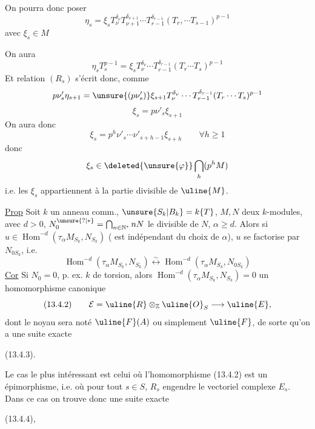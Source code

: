 On pourra donc poser
\[
\eta_s=\xi_s T_\nu^{\delta_\nu}T_{\nu+1}^{\delta_{\nu+1}}\cdots T_{r-1}^{\delta_{r-1}}(T_r,\cdots T_{s-1})^{p-1}
\]
avec $\xi_s\in M$

On aura
\[
\eta_sT_s^{p-1}=\xi_sT_\nu^{\delta_\nu}\cdots T_{r-1}^{\delta_{r-1}}(T_r\cdots T_s)^{p-1}
\]
Et relation $(R_s)$ s'écrit donc, comme
\[
p\nu'_s\eta_{s+1}=\unsure{(p\nu'_s)}\xi_{s+1}T_\nu^{\delta_\nu}\cdots T_{r-1}^{\delta_{r-1}}(T_r\cdots T_s)^{p-1}
\]
\[
\boxed{\xi_s=p\nu'_s\xi_{s+1}}
\]
On aura donc
\[
\xi_s=p^h\nu'_s\cdots\nu'_{s+h-1}\xi_{s+h}\qquad\forall h\geq1
\]
donc
\[
\xi_s\in\deleted{\unsure{\varphi}}\bigcap_h(p^hM)
\]
i.e. les $\xi_s$ appartiennent à la partie divisible de $\uline{M}$.

\uline{Prop} Soit $k$ un anneau comm., $\unsure{S_k|B_k}=k\{T\}$, $M,N$ deux $k$-modules, avec $d>0$, $N_0^{\unsure{?|*}}=\bigcap_{n\in\mathbb N^*}nN$ le   divisible de $N$, $\alpha\geq d$. Alors si $u\in\operatorname{Hom}^{-d}(\tau_\alpha M_{S_k},N_{S_k})$ (  est indépendant  du choix de $\alpha$), $u$ se factorise par $N_{0S_k}$, i.e.
\[
\operatorname{Hom}^{-d}(\tau_\alpha M_{S_k},N_{S_k})\overset{\sim}{\longleftrightarrow}\operatorname{Hom}^{-d}(\tau_\alpha M_{S_k},N_{0S_k})
\]
\uline{Cor} Si $N_0=0$, p. ex. $k$ de torsion, alors $\operatorname{Hom}^{-d}(\tau_\alpha M_{S_k},N_{S_k})=0$
un homomorphisme canonique
\[
(13.4.2)\qquad\mathcal E=\uline{R}\otimes_{\mathbb Z}\uline{O}_S\longrightarrow\uline{E},
\]
dont le noyau sera noté $\uline{F}(A)$ ou simplement $\uline{F}$, de sorte qu'on a une suite exacte

(13.4.3)\quad{}.

Le cas le plus intéressant est celui où l'homomorphisme (13.4.2) est un épimorphisme, i.e. où pour tout $s\in S$, $R_s$ engendre le vectoriel complexe $E_s$. Dans ce cas on trouve donc une suite exacte

(13.4.4)\quad{},

